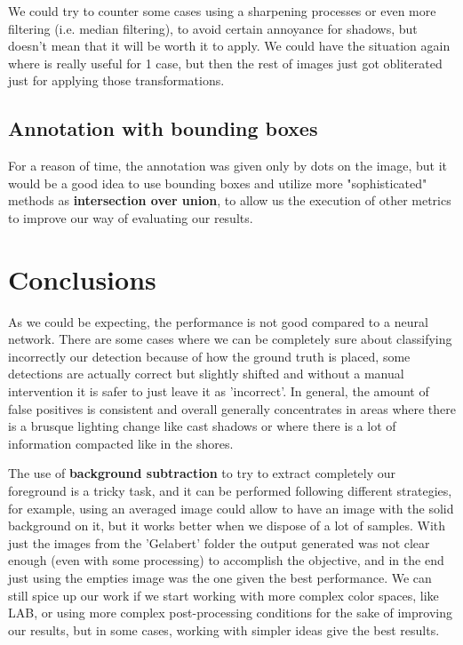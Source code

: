 \documentclass[11pt]{article}
\begin{document}
We could try to counter some cases using a sharpening processes or even more filtering (i.e. median filtering), to avoid certain annoyance for shadows, but doesn't mean that it will be worth it to apply. We could have the situation again where is really useful for 1 case, but then the rest of images just got obliterated just for applying those transformations.


\subsection*{Annotation with bounding boxes}
For a reason of time, the annotation was given only by dots on the image, but it would be a good idea to use bounding boxes and utilize more "sophisticated" methods as \textbf{intersection over union}, to allow us the execution of other metrics to improve our way of evaluating our results.

\section{Conclusions}


As we could be expecting, the performance is not good compared to a neural network. There are some cases where we can be completely sure about classifying incorrectly our detection because of how the ground truth is placed, some detections are actually correct but slightly shifted and without a manual intervention it is safer to just leave it as 'incorrect'. In general, the amount of false positives is consistent and overall  generally concentrates in areas where there is a brusque lighting change like cast shadows or where there is a lot of information compacted like in the shores.\newline

The use of \textbf{background subtraction} to try to extract completely our foreground is a tricky task, and it can be performed following different strategies, for example, using an averaged image could allow to have an image with the solid background on it, but it works better when we dispose of a lot of samples. With just the images from the 'Gelabert' folder the output generated was not clear enough (even with some processing) to accomplish the objective, and in the end just using the empties image was the one given the best performance. We can still spice up our work if we start working with more complex color spaces, like LAB, or using more complex post-processing conditions for the sake of improving our results, but in some cases, working with simpler ideas give the best results.\newline
\end{document}
